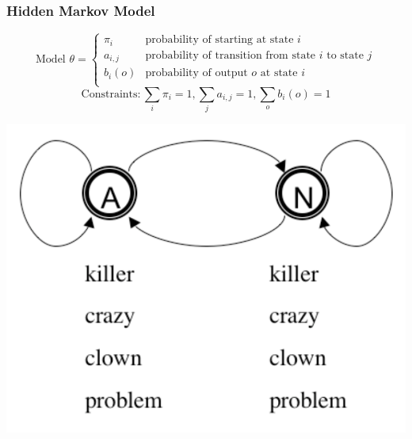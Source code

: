 \begin{frame}
\frametitle{Hidden Markov Model}
\[
\textrm{Model $\theta$} = \left\{ 
\begin{array}{ll} 
\pi_i & \textrm{probability of starting at state $i$} \\ 
a_{i,j} & \textrm{probability of transition from state $i$ to state $j$} \\ 
b_i(o) & \textrm{probability of output $o$ at state $i$} \\
\end{array} 
\right. 
\]
\[
\textrm{Constraints}: \sum_i \pi_i = 1, \sum_j a_{i,j} = 1, \sum_o b_i(o) = 1
\]

\begin{center}
\includegraphics[scale=.4]{figures/hmmfig}
\end{center}
\end{frame}


